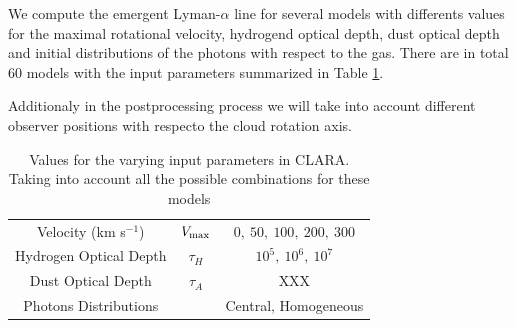 \documentclass{article}
\theoremstyle{definition}
\theoremstyle{remark}
\begin{document}
We compute the emergent Lyman-$\alpha$ line for several models with
differents values for the maximal rotational velocity, hydrogend optical
depth, dust optical depth and initial distributions of the photons
with respect to the gas. There are in total 60 models with the input
parameters summarized in Table  \ref{table:models}. 



Additionaly in the postprocessing process we will take into account
different observer positions with respecto the cloud rotation
axis.


\begin{table}
\begin{center}
\begin{tabular}{ccc}\hline
Velocity (km s$^{-1}$) & $V_{\rm max}$&$0,\ 50,\ 100,\ 200,\ 300$\\
Hydrogen Optical Depth & $\tau_{H} $ & $10^{5},\ 10^{6},\ 10^{7}$\\
Dust Optical Depth & $\tau_{A}$ & XXX \\
Photons Distributions & & Central, Homogeneous\\
\hline
\end{tabular}
\caption{
Values for the varying input parameters in CLARA. Taking into account
all the possible combinations for these models
} 
\label{table:models}
\end{center}
\end{table}
\end{document}
